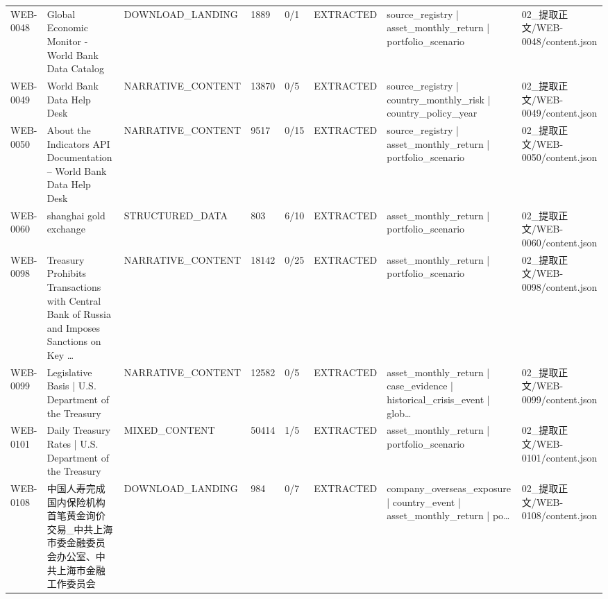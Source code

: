 \begin{landscape}
\begin{longtable}{p{1.8cm}p{4.2cm}p{3.0cm}p{1.4cm}p{1.6cm}p{2.4cm}p{4.2cm}p{4.2cm}}
WEB-0048 & Global Economic Monitor - World Bank Data Catalog & DOWNLOAD\_\allowbreak{}LANDING & 1889 & 0/\allowbreak{}1 & EXTRACTED & source\_\allowbreak{}registry | asset\_\allowbreak{}monthly\_\allowbreak{}return | portfolio\_\allowbreak{}scenario & 02\_\allowbreak{}提取正文/\allowbreak{}WEB-0048/\allowbreak{}content.json\\
WEB-0049 & World Bank Data Help Desk & NARRATIVE\_\allowbreak{}CONTENT & 13870 & 0/\allowbreak{}5 & EXTRACTED & source\_\allowbreak{}registry | country\_\allowbreak{}monthly\_\allowbreak{}risk | country\_\allowbreak{}policy\_\allowbreak{}year & 02\_\allowbreak{}提取正文/\allowbreak{}WEB-0049/\allowbreak{}content.json\\
WEB-0050 & About the Indicators API Documentation – World Bank Data Help Desk & NARRATIVE\_\allowbreak{}CONTENT & 9517 & 0/\allowbreak{}15 & EXTRACTED & source\_\allowbreak{}registry | asset\_\allowbreak{}monthly\_\allowbreak{}return | portfolio\_\allowbreak{}scenario & 02\_\allowbreak{}提取正文/\allowbreak{}WEB-0050/\allowbreak{}content.json\\
WEB-0060 & shanghai gold exchange & STRUCTURED\_\allowbreak{}DATA & 803 & 6/\allowbreak{}10 & EXTRACTED & asset\_\allowbreak{}monthly\_\allowbreak{}return | portfolio\_\allowbreak{}scenario & 02\_\allowbreak{}提取正文/\allowbreak{}WEB-0060/\allowbreak{}content.json\\
WEB-0098 & Treasury Prohibits Transactions with Central Bank of Russia and Imposes Sanctions on Key … & NARRATIVE\_\allowbreak{}CONTENT & 18142 & 0/\allowbreak{}25 & EXTRACTED & asset\_\allowbreak{}monthly\_\allowbreak{}return | portfolio\_\allowbreak{}scenario & 02\_\allowbreak{}提取正文/\allowbreak{}WEB-0098/\allowbreak{}content.json\\
WEB-0099 & Legislative Basis | U.S. Department of the Treasury & NARRATIVE\_\allowbreak{}CONTENT & 12582 & 0/\allowbreak{}5 & EXTRACTED & asset\_\allowbreak{}monthly\_\allowbreak{}return | case\_\allowbreak{}evidence | historical\_\allowbreak{}crisis\_\allowbreak{}event | glob… & 02\_\allowbreak{}提取正文/\allowbreak{}WEB-0099/\allowbreak{}content.json\\
WEB-0101 & Daily Treasury Rates | U.S. Department of the Treasury & MIXED\_\allowbreak{}CONTENT & 50414 & 1/\allowbreak{}5 & EXTRACTED & asset\_\allowbreak{}monthly\_\allowbreak{}return | portfolio\_\allowbreak{}scenario & 02\_\allowbreak{}提取正文/\allowbreak{}WEB-0101/\allowbreak{}content.json\\
WEB-0108 & 中国人寿完成国内保险机构首笔黄金询价交易\_\allowbreak{}中共上海市委金融委员会办公室、中共上海市金融工作委员会 & DOWNLOAD\_\allowbreak{}LANDING & 984 & 0/\allowbreak{}7 & EXTRACTED & company\_\allowbreak{}overseas\_\allowbreak{}exposure | country\_\allowbreak{}event | asset\_\allowbreak{}monthly\_\allowbreak{}return | po… & 02\_\allowbreak{}提取正文/\allowbreak{}WEB-0108/\allowbreak{}content.json\\

\end{longtable}
\end{landscape}
